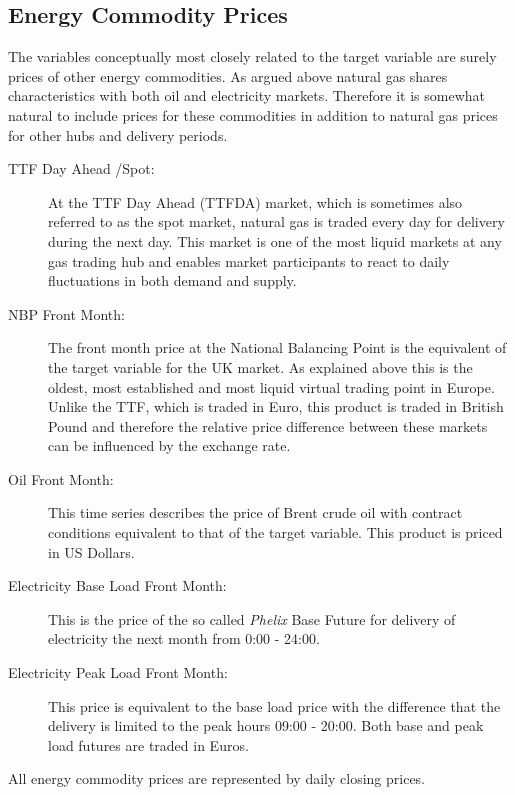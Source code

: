 \subsection{Energy Commodity Prices}
The variables conceptually most closely related to the target variable are surely prices of other energy commodities. As argued above natural gas shares characteristics with both oil and electricity markets. Therefore it is somewhat natural to include prices for these commodities in addition to natural gas prices for other hubs and delivery periods.
\begin{description}
\item[TTF Day Ahead /Spot:] At the TTF Day Ahead (TTFDA) market, which is sometimes also referred to as the spot market, natural gas is traded every day for delivery during the next day. This market is one of the most liquid markets at any gas trading hub and enables market participants to react to daily fluctuations in both demand and supply.
\item[NBP Front Month:] The front month price at the National Balancing Point is the equivalent of the target variable for the UK market. As explained above this is the oldest, most established and most liquid virtual trading point in Europe. Unlike the TTF, which is traded in Euro, this product is traded in British Pound and therefore the relative price difference between these markets can be influenced by the exchange rate.
\item[Oil Front Month:] This time series describes the price of  Brent crude oil with contract conditions equivalent to that of the target variable. This product is priced in US Dollars.
\item[Electricity Base Load Front Month:] This is the price of the so called \textit{Phelix} Base Future for delivery of electricity the next month from 0:00 - 24:00.
\item[Electricity Peak Load Front Month:] This price is equivalent to the base load price with the difference that the delivery is limited to the peak hours 09:00 - 20:00. Both base and peak load futures are traded in Euros.
\end{description}
All energy commodity prices are represented by daily closing prices.
